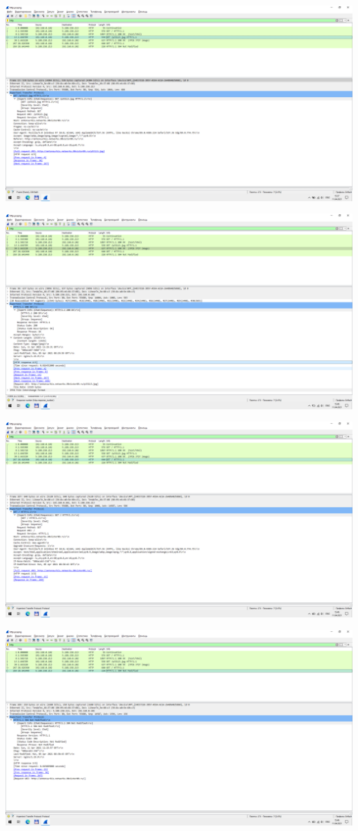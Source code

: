 \includegraphics[width=\textwidth]{screenshots/http_get_jpg_request_1}

\includegraphics[width=\textwidth]{screenshots/http_get_jpg_response_1}

\includegraphics[width=\textwidth]{screenshots/http_get_cached_request_1}

\includegraphics[width=\textwidth]{screenshots/http_get_cached_response_1}
